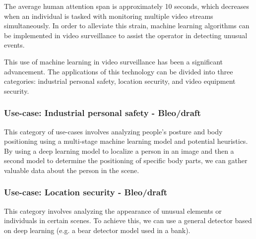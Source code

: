 \documentclass{article}
\begin{document}
The average human attention span is approximately 10 seconds\cite{attention_span}, which decreases when an individual is tasked with monitoring multiple video streams simultaneously. In order to alleviate this strain, machine learning algorithms can be implemented in video surveillance to assist the operator in detecting unusual events.

This use of machine learning in video surveillance has been a significant advancement. The applications of this technology can be divided into three categories: industrial personal safety, location security, and video equipment security.

    \subsubsection{Use-case: Industrial personal safety - Bleo/draft}
    This category of use-cases involves analyzing people's posture and body positioning using a multi-stage machine learning model and potential heuristics. By using a deep learning model to localize a person in an image and then a second model to determine the positioning of specific body parts, we can gather valuable data about the person in the scene.

    \subsubsection{Use-case: Location security - Bleo/draft}
    This category involves analyzing the appearance of unusual elements or individuals in certain scenes. To achieve this, we can use a general detector based on deep learning (e.g. a bear detector model used in a bank).
\end{document}
